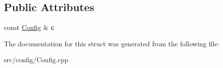 \subsection*{Public Attributes}
\begin{DoxyCompactItemize}
\item 
\mbox{\label{structtoTomlName_ac218bcee1d45d3e7a13da755b42bf19a}} 
const \hyperlink{classtheoria_1_1config_1_1Config}{Config} \& {\bfseries c}
\end{DoxyCompactItemize}


The documentation for this struct was generated from the following file\+:\begin{DoxyCompactItemize}
\item 
src/config/Config.\+cpp\end{DoxyCompactItemize}
